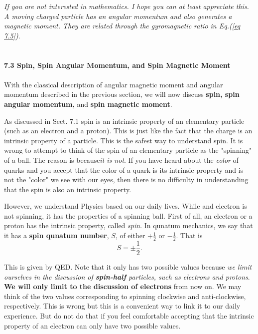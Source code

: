 \documentclass{article}
\begin{document}
\textit{If you are not interested in mathematics. I hope you can at least appreciate this.
A moving charged particle has an angular momentum and also generates a magnetic moment.
They are related through the gyromagnetic ratio in Eq.(\ref{eq 7.5})}.\\\\\\
\textbf{\large 7.3 Spin, Spin Angular Momentum, and Spin Magnetic Moment}\\\\
With the classical description of angular magnetic moment and angular momentum
described in the previous section, we will now discuss \textbf{spin, spin angular momentum,}
and \textbf{spin magnetic moment}.

As discussed in Sect. 7.1 spin is an intrinsic property of an elementary particle
(such as an electron and a proton). This is just like the fact that the charge is an
intrinsic property of a particle. This is the safest way to understand spin.
It is wrong to attempt to think of the spin of an elementary particle as the "spinning"
of a ball. The reason is because\textit{it is not}. If you have heard about the \textit{color} of quarks
and you accept that the color of a quark is its intrinsic property and is not the "color"
we see with our eyes, then there is no difficulty in understanding that the spin
is also an intrinsic property.

However, we understand Physics based on our daily lives. While and electron is not spinning,
it has the properties of a spinning ball. First of all, an electron or a proton has the intrinsic property,
called \textit{spin}. In qunatum mechanics, we say that it has a \textbf{spin qunatum number}, $S$, of either
$+\frac{1}{2}$ or $-\frac{1}{2}$. That is
\begin{equation}\label{eq 7.6}
    S=\pm\frac{1}{2}.\tag{7.6} 
\end{equation}

This is given by QED. Note that it only has two possible values because
\textit{we limit ourselves in the discussion of \textbf{spin-half} particles, such as 
electrons and protons}. \textbf{We will only limit to the discussion of electrons}
from now on. We may think of the two values corresponding to spinning clockwise and 
anti-clockwise, respectively. This is wrong but this is a convenient way to link
it to our daily experience. But do not do that if you feel comfortable accepting that the intrinsic
property of an electron can only have two possible values.
\end{document}
